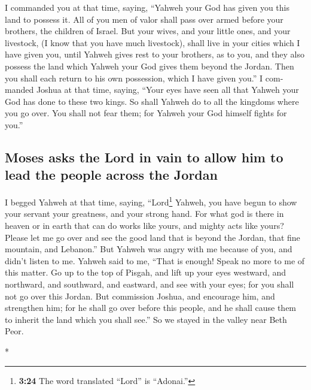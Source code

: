 \begin{paracol}{2}
\begin{otherlanguage}{english}
 I commanded you at that time, saying, ``Yahweh your God
has given you this land to possess it. All of you men of valor shall
pass over armed before your brothers, the children of Israel.
 But your wives, and your little ones, and your
livestock, (I know that you have much livestock), shall live in your
cities which I have given you,  until Yahweh gives rest
to your brothers, as to you, and they also possess the land which Yahweh
your God gives them beyond the Jordan. Then you shall each return to his
own possession, which I have given you.''  I commanded
Joshua at that time, saying, ``Your eyes have seen all that Yahweh your
God has done to these two kings. So shall Yahweh do to all the kingdoms
where you go over.  You shall not fear them; for Yahweh
your God himself fights for you.''

\hypertarget{moses-asks-the-lord-in-vain-to-allow-him-to-lead-the-people-across-the-jordan}{%
\subsection{Moses asks the Lord in vain to allow him to lead the people
across the
Jordan}\label{moses-asks-the-lord-in-vain-to-allow-him-to-lead-the-people-across-the-jordan}}

 I begged Yahweh at that time, saying, 
``Lord\footnote{\textbf{3:24} The word translated ``Lord'' is
  ``Adonai.''} Yahweh, you have begun to show your servant your
greatness, and your strong hand. For what god is there in heaven or in
earth that can do works like yours, and mighty acts like yours?
 Please let me go over and see the good land that is
beyond the Jordan, that fine mountain, and Lebanon.'' 
But Yahweh was angry with me because of you, and didn't listen to me.
Yahweh said to me, ``That is enough! Speak no more to me of this matter.
 Go up to the top of Pisgah, and lift up your eyes
westward, and northward, and southward, and eastward, and see with your
eyes; for you shall not go over this Jordan.  But
commission Joshua, and encourage him, and strengthen him; for he shall
go over before this people, and he shall cause them to inherit the land
which you shall see.''  So we stayed in the valley near
Beth Peor.

\end{otherlanguage}

\switchcolumn[0]*


\end{paracol}
